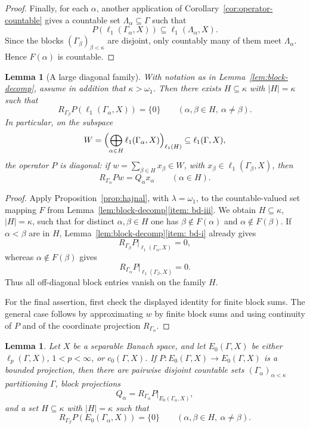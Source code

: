 \documentclass[11pt]{amsart}
\theoremstyle{plain}
\newtheorem{lemma}[theorem]{Lemma}
\theoremstyle{definition}
\numberwithin{equation}{section}
\newcommand{\abs}[1]{\left|#1\right|}
\begin{document}
\begin{proof}
Finally, for each $\alpha$, another application of Corollary~\ref{cor:operator-countable} gives a countable set $\Lambda_\alpha\subseteq\Gamma$ such that
\[
    P(\ell_1(\Gamma_\alpha,X))\subseteq \ell_1(\Lambda_\alpha,X).
\]
Since the blocks $(\Gamma_\beta)_{\beta<\kappa}$ are disjoint, only countably many of them meet $\Lambda_\alpha$.  Hence $F(\alpha)$ is countable.
\end{proof}

\begin{lemma}[A large diagonal family]\label{lem:large-diagonal}
With notation as in Lemma~\ref{lem:block-decomp}, assume in addition that $\kappa>\omega_1$.  Then there exists $H\subseteq\kappa$ with $\abs{H}=\kappa$ such that
\[
R_{\Gamma_\beta} P(\ell_1(\Gamma_\alpha, X))=\{0\}\qquad(\alpha,\beta\in H,\ \alpha\neq \beta).
\]
In particular, on the subspace
\[
W=\Bigl(\bigoplus_{\alpha\in H} \ell_1(\Gamma_\alpha, X)\Bigr)_{\ell_1(H)}\subseteq \ell_1(\Gamma,X),
\]
the operator $P$ is diagonal: if $w=\sum_{\beta\in H}x_\beta\in W$, with $x_\beta\in\ell_1(\Gamma_\beta,X)$, then
\[
R_{\Gamma_\alpha} Pw=Q_\alpha x_\alpha\qquad(\alpha\in H).
\]
\end{lemma}

\begin{proof}
Apply Proposition~\ref{prop:hajnal}, with $\lambda=\omega_1$, to the countable-valued set mapping $F$ from Lemma~\ref{lem:block-decomp}\ref{item: bd-iii}.  We obtain $H\subseteq\kappa$, $\abs{H}=\kappa$, such that for distinct $\alpha,\beta\in H$ one has $\beta\notin F(\alpha)$ and $\alpha\notin F(\beta)$.  If $\alpha<\beta$ are in $H$, Lemma~\ref{lem:block-decomp}\ref{item: bd-i} already gives
\[
    R_{\Gamma_\beta}P|_{\ell_1(\Gamma_\alpha,X)}=0,
\]
whereas $\alpha\notin F(\beta)$ gives
\[
    R_{\Gamma_\alpha}P|_{\ell_1(\Gamma_\beta,X)}=0.
\]
Thus all off-diagonal block entries vanish on the family $H$.

For the final assertion, first check the displayed identity for finite block sums.  The general case follows by approximating $w$ by finite block sums and using continuity of $P$ and of the coordinate projection $R_{\Gamma_\alpha}$.
\end{proof}

\begin{lemma}\label{lema:block-diagonal-lp-c0}
Let $X$ be a separable Banach space, and let $E_0(\Gamma,X)$ be either
$\ell_p(\Gamma,X)$, $1<p<\infty$, or $c_0(\Gamma,X)$.  If
$P\colon E_0(\Gamma,X)\to E_0(\Gamma,X)$ is a bounded projection, then there are
pairwise disjoint countable sets $(\Gamma_\alpha)_{\alpha<\kappa}$ partitioning
$\Gamma$, block projections
\[
    Q_\alpha=R_{\Gamma_\alpha}P|_{E_0(\Gamma_\alpha,X)},
\]
and a set $H\subseteq\kappa$ with $\abs H=\kappa$ such that
\[
    R_{\Gamma_\beta}P(E_0(\Gamma_\alpha,X))=\{0\}
    \qquad(\alpha,\beta\in H,\ \alpha\neq\beta).
\]
\end{lemma}
\end{document}
